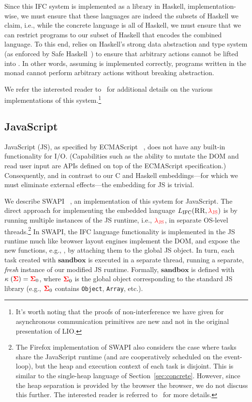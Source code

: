 \documentclass{sigplanconf}
\newcommand{\Red}[1]{{\color{red} #1}}
\newcommand{\tocite}[1]{\Red{\cite{#1}}}
\begin{document}
Since this IFC system is implemented as a library in Haskell,
implementation-wise, we must ensure that these languages are indeed the subsets of Haskell
we claim, i.e., while the concrete language is all of Haskell, we must
ensure that we can restrict programs to our subset of Haskell that
encodes the combined language.
%
To this end,  relies on Haskell's strong data abstraction and type system
(as enforced by Safe Haskell~\cite{Terei:2012:SH:2364506.2364524}) to
ensure that arbitrary  actions cannot be lifted into
.
%
In other words, assuming  is implemented correctly, programs
written in the  monad cannot perform arbitrary  actions
without breaking abstraction.

We refer the interested reader to~\cite{lio,stefan:addressing-covert} for
additional details on the various implementations of this system.\footnote{It's worth noting that the proofs of non-interference we have given for asynchronous communication primitives are new and not in the original presentation of LIO.}


\subsection{JavaScript}
\label{sec:real:js}

JavaScript (JS), as specified by ECMAScript~\tocite{}, does not have any
built-in functionality for I/O. (Capabilities such as the ability to
mutate the DOM and read user input are APIs defined on top of the ECMAScript
specification.)
%
Consequently, and in contrast to our C and Haskell embeddings---for
which we must eliminate external effects---the embedding for JS is
trivial.

We describe SWAPI~\tocite{}, an implementation of this system for JavaScript.
%
The direct approach for implementing the embedded language \ensuremath{L_\text{IFC}(\textsc{RR},\Red{\lambda_{\text{JS}}})} is
by running multiple instances of the JS runtime, i.e., \ensuremath{\Red{\lambda_{\text{JS}}}}, in
separate OS-level threads.\footnote{
 The Firefox implementation of SWAPI also considers the case where
 tasks share the JavaScript runtime (and are cooperatively scheduled
 on the event-loop), but the heap and execution context of each task
 is disjoint. This is similar to the single-heap language of
 Section~\ref{sec:concrete}.  However, since the heap separation is
 provided by the browser the browser, we do not discuss this further.
 The interested reader is referred to~\tocite{} for more details.
}
%
In SWAPI, the IFC language functionality is implemented in the JS
runtime much like browser layout engines implement the DOM, and expose
the new functions, e.g., , by attaching them to
the global JS object.
%
In turn, each task created with \ensuremath{\mathbf{sandbox}} is
executed in a separate thread, running a separate, \emph{fresh} instance of our
modified JS runtime.
%
Formally, \ensuremath{\mathbf{sandbox}} is defined with \ensuremath{\kappa\;(\tar{\Sigma})\mathrel{=}\tar{\Sigma}_{0}}, where \ensuremath{\tar{\Sigma}_{0}} is the global object corresponding to the standard
JS library (e.g., \ensuremath{\tar{\Sigma}_{0}} contains \texttt{Object}, \texttt{Array},
etc.).
\end{document}
